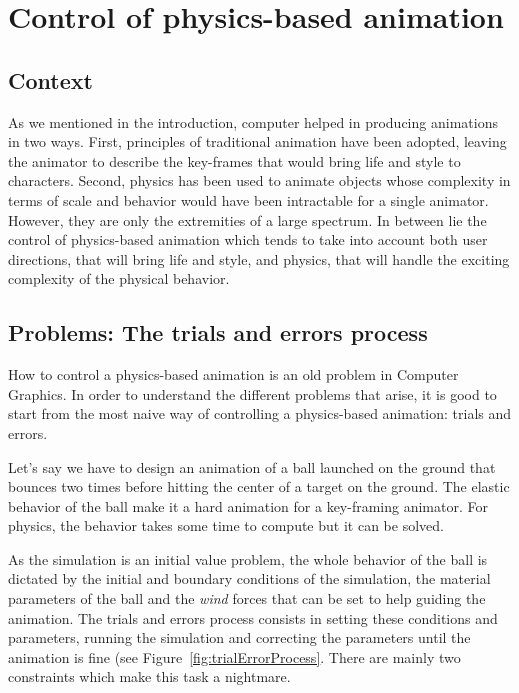 \section{Control of physics-based animation}

\subsection{Context}
As we mentioned in the introduction, computer helped in producing animations in two ways. First, principles of traditional animation have been adopted, leaving the animator to describe the key-frames that would bring life and style to characters. Second, physics has been used to animate objects whose complexity in terms of scale and behavior would have been intractable for a single animator. However, they are only the extremities of a large spectrum. In between lie the control of physics-based animation which tends to take into account both user directions, that will bring life and style, and physics, that will handle the exciting complexity of the physical behavior.

\subsection{Problems: The trials and errors process}

How to control a physics-based animation is an old problem in Computer Graphics. In order to understand the different problems that arise, it is good to start from the most naive way of controlling a physics-based animation: trials and errors. 

Let's say we have to design an animation of a ball launched on the ground that bounces two times before hitting the center of a target on the ground. The elastic behavior of the ball make it a hard animation for a key-framing animator. For physics, the behavior takes some time to compute but it can be solved.

As the simulation is an initial value problem, the whole behavior of the ball is dictated by the initial and boundary conditions of the simulation, the material parameters of the ball and the \emph{wind} forces that can be set to help guiding the animation. The trials and errors process consists in setting these conditions and parameters, running the simulation and correcting the parameters until the animation is fine (see Figure~\ref{fig:trialErrorProcess}. There are mainly two constraints which make this task a nightmare.

